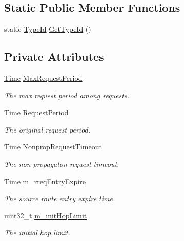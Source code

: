 \subsection*{Static Public Member Functions}
\begin{DoxyCompactItemize}
\item 
static \hyperlink{classns3_1_1TypeId}{Type\+Id} \hyperlink{classns3_1_1dsr_1_1DsrRreqTable_ab2490f784bfac28f6eb65eb36b1f3f87}{Get\+Type\+Id} ()
\end{DoxyCompactItemize}
\subsection*{Private Attributes}
\begin{DoxyCompactItemize}
\item 
\hyperlink{classns3_1_1Time}{Time} \hyperlink{classns3_1_1dsr_1_1DsrRreqTable_a3fbde93274fc9df61927bc78f444ef8f}{Max\+Request\+Period}
\begin{DoxyCompactList}\small\item\em The max request period among requests. \end{DoxyCompactList}\item 
\hyperlink{classns3_1_1Time}{Time} \hyperlink{classns3_1_1dsr_1_1DsrRreqTable_a96ba8174c060432e6c624d39180240a3}{Request\+Period}
\begin{DoxyCompactList}\small\item\em The original request period. \end{DoxyCompactList}\item 
\hyperlink{classns3_1_1Time}{Time} \hyperlink{classns3_1_1dsr_1_1DsrRreqTable_a10b2143f760b262b8328608cf592910a}{Nonprop\+Request\+Timeout}
\begin{DoxyCompactList}\small\item\em The non-\/propagaton request timeout. \end{DoxyCompactList}\item 
\hyperlink{classns3_1_1Time}{Time} \hyperlink{classns3_1_1dsr_1_1DsrRreqTable_a5c13c1df73a723cb17973459d5c54923}{m\+\_\+rreq\+Entry\+Expire}
\begin{DoxyCompactList}\small\item\em The source route entry expire time. \end{DoxyCompactList}\item 
uint32\+\_\+t \hyperlink{classns3_1_1dsr_1_1DsrRreqTable_a4cb16174a46751999a3671b851cd4d38}{m\+\_\+init\+Hop\+Limit}
\begin{DoxyCompactList}\small\item\em The initial hop limit. \end{DoxyCompactList}\item 

\end{DoxyCompactItemize}
